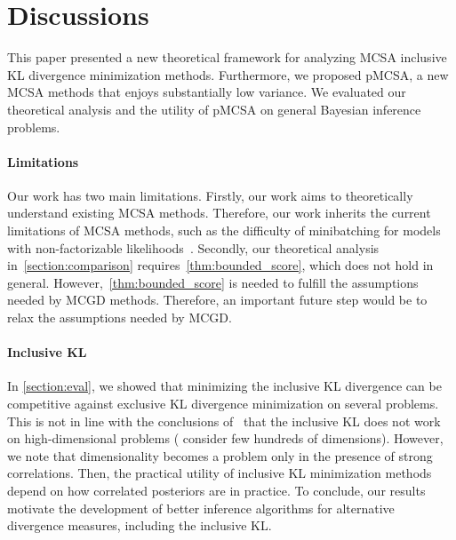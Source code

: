 
\vspace{-0.15in}
\section{Discussions}\label{section:discussion}
\vspace{-0.1in}
This paper presented a new theoretical framework for analyzing MCSA inclusive KL divergence minimization methods.
Furthermore, we proposed pMCSA, a new MCSA methods that enjoys substantially low variance.
We evaluated our theoretical analysis and the utility of pMCSA on general Bayesian inference problems.

\vspace{-0.1in}
\paragraph{Limitations}
Our work has two main limitations.
Firstly, our work aims to theoretically understand existing MCSA methods.
Therefore, our work inherits the current limitations of MCSA methods, such as the difficulty of minibatching for models with non-factorizable likelihoods~\citep{NEURIPS2020_b2070693}.
Secondly, our theoretical analysis in~\cref{section:comparison} requires~\cref{thm:bounded_score}, which does not hold in general.
However,~\cref{thm:bounded_score} is needed to fulfill the assumptions needed by MCGD methods.
Therefore, an important future step would be to relax the assumptions needed by MCGD.

\vspace{-0.1in}
\paragraph{Inclusive KL}
In \cref{section:eval}, we showed that minimizing the inclusive KL divergence can be competitive against exclusive KL divergence minimization on several problems.
This is not in line with the conclusions of~\citet{dhaka_challenges_2021} that the inclusive KL does not work on high-dimensional problems (\citeauthor{dhaka_challenges_2021} consider few hundreds of dimensions).
However, we note that dimensionality becomes a problem only in the presence of strong correlations.
Then, the practical utility of inclusive KL minimization methods depend on how correlated posteriors are in practice.
To conclude, our results motivate the development of better inference algorithms for alternative divergence measures, including the inclusive KL. 


